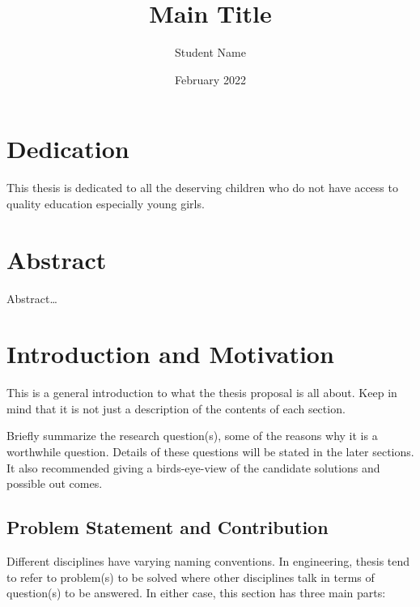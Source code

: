 \documentclass[11pt,a4paper,oneside]{book} %
\title{Main Title}
\author{Student Name}
\date{February 2022}
\numberwithin{equation}{section}
\begin{document}
\maketitle

\thesisAcceptanceCertificate


\chapter*{Dedication}
This thesis is dedicated to all the deserving children who do not have access to quality education especially young girls.

\certificateoforiginality


\tableofcontents
\listoffigures
\listoftables

\chapter*{Abstract}
Abstract\ldots

\resetpagenumbering

\chapter{Introduction and Motivation}\label{c-intro}

This is a general introduction to what the thesis proposal is all about. Keep in mind that it is not just a description of the contents of each section. 

Briefly summarize the research question(s), some of the reasons why it is a worthwhile question. Details of these questions will be stated in the later sections. It also recommended giving a birds-eye-view of the candidate solutions and possible out comes.

\section{Problem Statement and Contribution}
Different disciplines have varying naming conventions. In engineering, thesis tend to refer to problem(s) to be solved where other disciplines talk in terms of question(s) to be answered. In either case, this section has three main parts:
\end{document}
